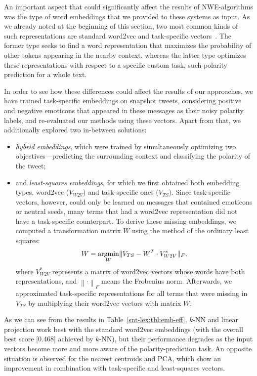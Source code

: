 An important aspect that could significantly affect the results of
NWE-algorithms was the type of word embeddings that we provided to
these systems as input.  As we already noted at the beginning of this
section, two most common kinds of such representations are standard
word2vec and task-specific vectors~\cite{Mikolov:13,Collobert:11}.
The former type seeks to find a word representation that maximizes the
probability of other tokens appearing in the nearby context, whereas
the latter type optimizes these representations with respect to a
specific custom task, such polarity prediction for a whole text.

In order to see how these differences could affect the results of our
approaches, we have trained task-specific embeddings on snapshot
tweets, considering positive and negative emoticons that appeared in
these messages as their noisy polarity labels, and re-evaluated our
methods using these vectors.  Apart from that, we additionally
explored two in-between solutions:
\begin{itemize}
\item \emph{hybrid embeddings}, which were trained by simultaneously
  optimizing two objectives---predicting the surrounding context and
  classifying the polarity of the tweet;
\item and \emph{least-squares embeddings}, for which we first obtained
  both embedding types, word2vec ($V_{W2V}$) and task-specific ones
  ($V_{TS}$).  Since task-specific vectors, however, could only be
  learned on messages that contained emoticons or neutral seeds, many
  terms that had a word2vec representation did not have a
  task-specific counterpart.  To derive these missing embeddings, we
  computed a transformation matrix $W$ using the method of the
  ordinary least squares:
  \begin{equation}\label{eq:fgsa:least-sq}
    W = \argmin_{W}\lVert V_{TS} - W^T\cdot V^*_{W2V}\rVert_F,
  \end{equation}
  where $V^*_{W2V}$ represents a matrix of word2vec vectors whose
  words have both representations, and
  $\left\lVert\cdot\right\rVert_F$ means the Frobenius norm.
  Afterwards, we approximated task-specific representations for all
  terms that were missing in $V_{TS}$ by multiplying their word2vec
  vectors with matrix $W$.
\end{itemize}

As we can see from the results in Table~\ref{snt-lex:tbl:emb-eff},
$k$-NN and linear projection work best with the standard word2vec
embeddings (with the overall best score [0.468] achieved by $k$-NN),
but their performance degrades as the input vectors become more and
more aware of the polarity-prediction task.  An opposite situation is
observed for the nearest centroids and PCA, which show an improvement
in combination with task-specific and least-squares vectors.

